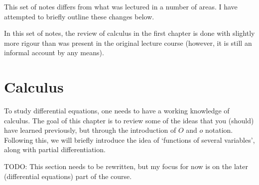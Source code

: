 \documentclass[a4paper]{scrreprt}
\newcommand{\dd}{\mathrm{d}}
\begin{document}
This set of notes differs from what was lectured in a number of areas. I have attempted to briefly outline these changes below.

In this set of notes, the review of calculus in the first chapter is done with slightly more rigour than was present in the original lecture course (however, it is still an informal account by any means).


\clearpage


\chapter{Calculus}

To study differential equations, one needs to have a working knowledge of calculus. The goal of this chapter is to review some of the ideas that you (should) have learned previously, but through the introduction of $O$ and $o$ notation. Following this, we will briefly introduce the idea of `functions of several variables', along with partial differentiation.

{\color{red} TODO: This section needs to be rewritten, but my focus for now is on the later (differential equations) part of the course.}






\end{document}
